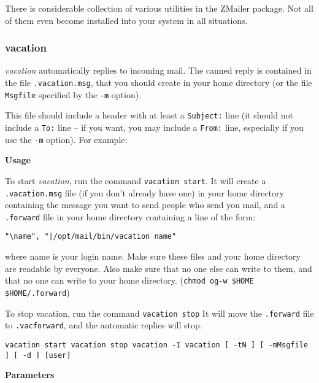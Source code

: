 
There is considerable collection of various utilities in the
ZMailer package. Not all of them even become installed into
your system in all situations.

\subsubsection{vacation}

{\em vacation\/} automatically replies to incoming mail. The canned 
reply is contained in the file {\tt .vacation.msg}, that you should 
create in your home directory (or the file {\tt Msgfile} specified by 
the {\tt -m} option).

This file should include a header with at least a {\tt Subject:} line 
(it should not include a {\tt To:} line -- if you want, you may include 
a {\tt From:} line, especially if you use the {\tt -m} option). 
For example:

{\bf Usage}

To start {\em vacation\/}, run the command {\tt vacation start}. 
It will create a {\tt .vacation.msg} file (if you don't already 
have one) in your home directory containing the message you want to send 
people who send you mail, and a {\tt .forward} file in your home 
directory containing a line of the form:

\begin{tscreen}
\begin{verbatim}
"\name", "|/opt/mail/bin/vacation name"
\end{verbatim}
\end{tscreen}


where name is your login name. Make sure these files and your home 
directory are readable by everyone. Also  make sure  that  no  one  
else  can  write  to  them,  and  that  no  one  can  write  to  your  
home  directory. ({\tt chmod og-w \$HOME \$HOME/.forward})

To stop vacation, run the command {\tt vacation stop} It will move the 
{\tt .forward} file to {\tt .vacforward}, and the automatic 
replies will stop.

{\tt vacation start vacation stop vacation -I vacation [ -tN ] [ -mMsgfile ] [ -d ] [user]}

{\bf Parameters}

